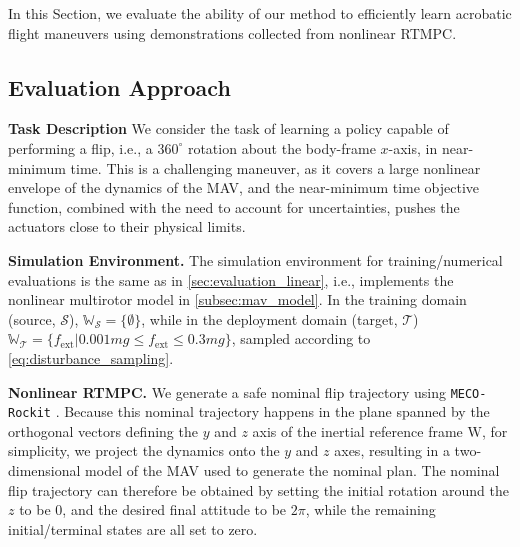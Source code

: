 In this Section, we evaluate the ability of our method to efficiently learn acrobatic flight maneuvers using demonstrations collected from nonlinear \ac{RTMPC}. 

\subsection{Evaluation Approach}
\noindent \textbf{Task Description}
We consider the task of learning a policy capable of performing a flip, i.e., a $360^\circ$ rotation about the body-frame $x$-axis, in near-minimum time. This is a challenging maneuver, as it covers a large nonlinear envelope of the dynamics of the \ac{MAV}, and the near-minimum time objective function, combined with the need to account for uncertainties, pushes the actuators close to their physical limits. 

\noindent
\textbf{Simulation Environment.} The simulation environment for training/numerical evaluations is the same as in \cref{sec:evaluation_linear}, i.e., implements the nonlinear multirotor model in \cref{subsec:mav_model}. In the training domain (source, $\mathcal{S}$), $\mathbb{W}_\mathcal{S} = \{ \emptyset \}$, while in the deployment domain (target, $\mathcal{T}$) $\mathbb{W}_\mathcal{T} = \{f_\text{ext} | 0.001 m g \leq f_\text{ext} \leq 0.3 m g \}$, sampled according to \cref{eq:disturbance_sampling}.


\noindent \textbf{Nonlinear \ac{RTMPC}.}
We generate a safe nominal flip trajectory using \texttt{MECO-Rockit} \cite{gillis2020effortless}. Because this nominal trajectory happens in the plane spanned by the orthogonal vectors defining the $y$ and $z$ axis of the inertial reference frame $\text{W}$, for simplicity, we project the dynamics onto the $y$ and $z$ axes, resulting in a two-dimensional model of the \ac{MAV} used to generate the nominal plan. The nominal flip trajectory can therefore be obtained by setting the initial rotation around the $z$ to be $0$, and the desired final attitude to be $2 \pi$, while the remaining initial/terminal states are all set to zero. 

